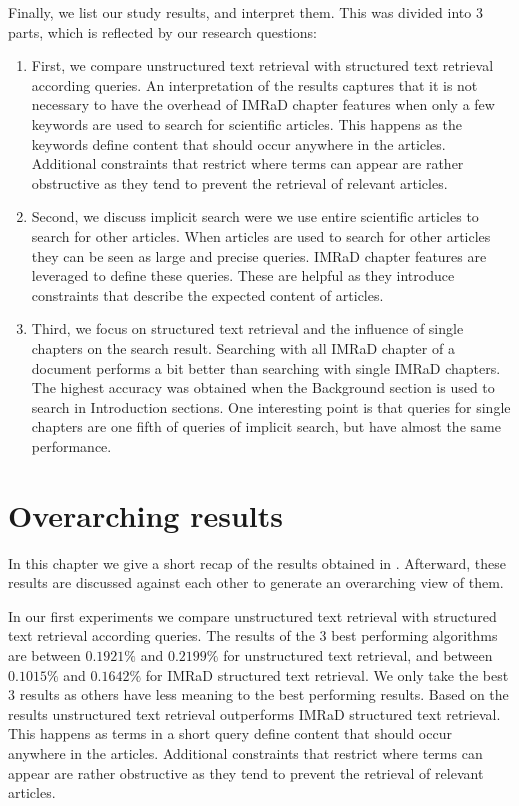 Finally, we list our study results, and interpret them. This was divided into $3$ parts, which is reflected by our research questions:
\begin{enumerate}[label=(\alph*)]
  \item First, we compare unstructured text retrieval with structured text retrieval according queries. An interpretation of the results captures that it is not necessary to have the overhead of IMRaD chapter features when only a few keywords are used to search for scientific articles. This happens as the keywords define content that should occur anywhere in the articles. Additional constraints that restrict where terms can appear are rather obstructive as they tend to prevent the retrieval of relevant articles.
  \item Second, we discuss implicit search were we use entire scientific articles to search for other articles. When articles are used to search for other articles they can be seen as large and precise queries. IMRaD chapter features are leveraged to define these queries. These are helpful as they introduce constraints that describe the expected content of articles.
  \item Third, we focus on structured text retrieval and the influence of single chapters on the search result. Searching with all IMRaD chapter of a document performs a bit better than searching with single IMRaD chapters. The highest accuracy was obtained when the Background section is used to search in Introduction sections. One interesting point is that queries for single chapters are one fifth of queries of implicit search, but have almost the same performance.
\end{enumerate}

\section{Overarching results}
\label{sec:overarching_results}

In this chapter we give a short recap of the results obtained in . Afterward, these results are discussed against each other to generate an overarching view of them.

In our first experiments we compare unstructured text retrieval with structured text retrieval according queries. The results of the $3$ best performing algorithms are between $0.1921\%$ and $0.2199\%$ for unstructured text retrieval, and between $0.1015\%$ and $0.1642\%$ for IMRaD structured text retrieval. We only take the best $3$ results as others have less meaning to the best performing results. Based on the results unstructured text retrieval outperforms IMRaD structured text retrieval. This happens as terms in a short query define content that should occur anywhere in the articles. Additional constraints that restrict where terms can appear are rather obstructive as they tend to prevent the retrieval of relevant articles.

